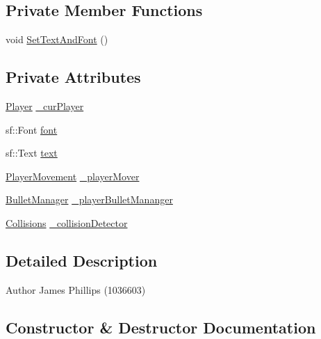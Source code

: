 \subsection*{Private Member Functions}
\begin{DoxyCompactItemize}
\item 
void \hyperlink{class_player_manager_a7f6871a42521409f64c1a335a48c4398}{Set\+Text\+And\+Font} ()
\end{DoxyCompactItemize}
\subsection*{Private Attributes}
\begin{DoxyCompactItemize}
\item 
\hyperlink{class_player}{Player} \hyperlink{class_player_manager_a60256e044fc83080d90cd57d24ba0e29}{\+\_\+cur\+Player}
\item 
sf\+::\+Font \hyperlink{class_player_manager_a01378a061dd9a9170c6f45cd1955dec1}{font}
\item 
sf\+::\+Text \hyperlink{class_player_manager_a2fc335171a9117a91aa672cf4ce78e1a}{text}
\item 
\hyperlink{class_player_movement}{Player\+Movement} \hyperlink{class_player_manager_a1c29120eaa2bd04b1a9f270cbd8ac749}{\+\_\+player\+Mover}
\item 
\hyperlink{class_bullet_manager}{Bullet\+Manager} \hyperlink{class_player_manager_a8e97405a3e13fc9c7dbba27e09ffd66d}{\+\_\+player\+Bullet\+Mananger}
\item 
\hyperlink{class_collisions}{Collisions} \hyperlink{class_player_manager_ae736dee4829cc21604a6d800b7a2222e}{\+\_\+collision\+Detector}
\end{DoxyCompactItemize}


\subsection{Detailed Description}
\begin{DoxyAuthor}{Author}
James Phillips (1036603) 
\end{DoxyAuthor}


\subsection{Constructor \& Destructor Documentation}
\mbox{\label{class_player_manager_aa2ce60af19b9d80bd884e2edaea726d6}} 
